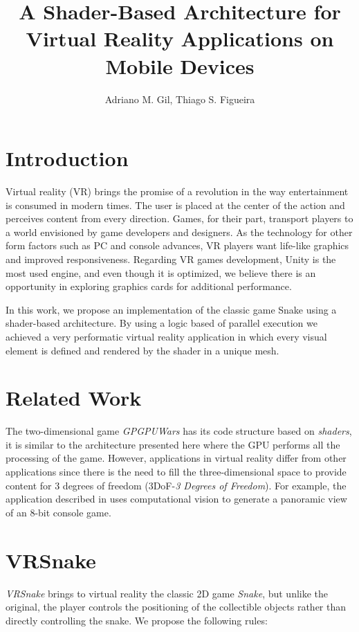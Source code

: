 \documentclass[12pt]{article}
\title{A Shader-Based Architecture for Virtual Reality Applications on Mobile Devices}
\author{Adriano M. Gil\inst{1}, Thiago S. Figueira\inst{1}}
\begin{document}
\maketitle

\smallskip

\section{Introduction}
Virtual reality (VR) brings the promise of a revolution in the way entertainment is consumed in modern times. The user is placed at the center of the action and perceives content from every direction. Games, for their part, transport players to a world envisioned by game developers and designers. As the technology for other form factors such as PC and console advances, VR players want life-like graphics and improved responsiveness. Regarding VR games development, Unity is the most used engine, and even though it is optimized, we believe there is an opportunity in exploring graphics cards for additional performance.

In this work, we propose an implementation of the classic game Snake using a shader-based architecture. By using a logic based of parallel execution we achieved a very performatic virtual reality application in which every visual element is defined and rendered by the shader in a unique mesh.

\section{Related Work}
The two-dimensional game \textit{GPGPUWars} \cite{joselli2009gpuwars} has its code structure based on \textit{shaders}, it is similar to the architecture presented here where the GPU performs all the processing of the game. However, applications in virtual reality differ from other applications since there is the need to fill the three-dimensional space to provide content for 3 degrees of freedom (3DoF-\textit{3 Degrees of Freedom}). For example, the application described in \cite{zund2015unfolding} uses computational vision to generate a panoramic view of an 8-bit console game.

\section{VRSnake} \label{sec:vrsnake}
\textit{VRSnake} brings to virtual reality the classic 2D game \textit{Snake}, but unlike the original, the player controls the positioning of the collectible objects rather than directly controlling the snake. We propose the following rules: 
\end{document}
